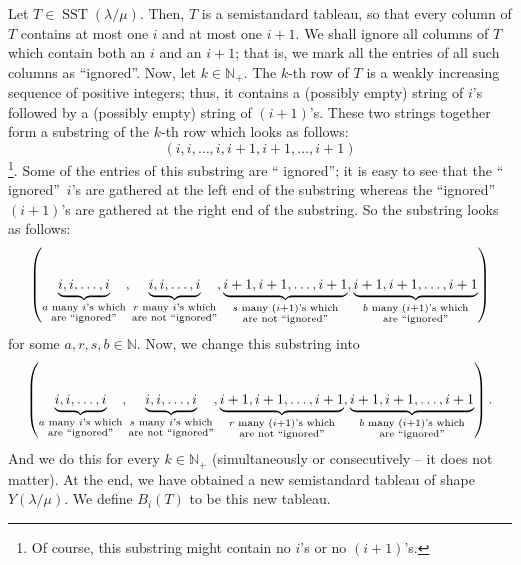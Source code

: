 \documentclass[numbers=enddot,12pt,final,onecolumn,notitlepage]{scrartcl}%
\theoremstyle{definition}
\begin{document}
Let $T\in\operatorname*{SST}\left(  \lambda/\mu\right)  $. Then, $T$ is a
semistandard tableau, so that every column of $T$ contains at most one $i$ and
at most one $i+1$. We shall ignore all columns of $T$ which contain both an
$i$ and an $i+1$; that is, we mark all the entries of all such columns as
\textquotedblleft ignored\textquotedblright. Now, let $k\in\mathbb{N}_{+}$.
The $k$-th row of $T$ is a weakly increasing sequence of positive integers;
thus, it contains a (possibly empty) string of $i$'s followed by a (possibly
empty) string of $\left(  i+1\right)  $'s. These two strings together form a
substring of the $k$-th row which looks as follows:%
\[
\left(  i,i,\ldots,i,i+1,i+1,\ldots,i+1\right)
\]
\footnote{Of course, this substring
might contain no $i$'s or no $\left(  i+1\right)$'s.}.
Some of the entries of this substring are \textquotedblleft
ignored\textquotedblright; it is easy to see that the \textquotedblleft
ignored\textquotedblright\ $i$'s are gathered at the left end of the substring
whereas the \textquotedblleft ignored\textquotedblright\ $\left(  i+1\right)
$'s are gathered at the right end of the substring. So the substring looks
as follows:
\[
\left(  \underbrace{i,i,\ldots,i}_{\substack{a\text{ many }i\text{'s
which}\\\text{are \textquotedblleft ignored\textquotedblright}}%
},\underbrace{i,i,\ldots,i}_{\substack{r\text{ many }i\text{'s which}%
\\\text{are not \textquotedblleft ignored\textquotedblright}}%
},\underbrace{i+1,i+1,\ldots,i+1}_{\substack{s\text{ many }\left(  i+1\right)
\text{'s which}\\\text{are not \textquotedblleft ignored\textquotedblright}%
}},\underbrace{i+1,i+1,\ldots,i+1}_{\substack{b\text{ many }\left(
i+1\right)  \text{'s which}\\\text{are \textquotedblleft
ignored\textquotedblright}}}\right)
\]
for some $a,r,s,b\in\mathbb{N}$. Now, we change this substring into%
\[
\left(  \underbrace{i,i,\ldots,i}_{\substack{a\text{ many }i\text{'s
which}\\\text{are \textquotedblleft ignored\textquotedblright}}%
},\underbrace{i,i,\ldots,i}_{\substack{s\text{ many }i\text{'s which}%
\\\text{are not \textquotedblleft ignored\textquotedblright}}%
},\underbrace{i+1,i+1,\ldots,i+1}_{\substack{r\text{ many }\left(  i+1\right)
\text{'s which}\\\text{are not \textquotedblleft ignored\textquotedblright}%
}},\underbrace{i+1,i+1,\ldots,i+1}_{\substack{b\text{ many }\left(
i+1\right)  \text{'s which}\\\text{are \textquotedblleft
ignored\textquotedblright}}}\right)  .
\]
And we do this for every $k\in\mathbb{N}_{+}$ (simultaneously or consecutively
-- it does not matter). At the end, we have obtained a new semistandard
tableau of shape $Y\left(  \lambda/\mu\right)  $. We define $B_{i}\left(
T\right)  $ to be this new tableau.
\end{document}
